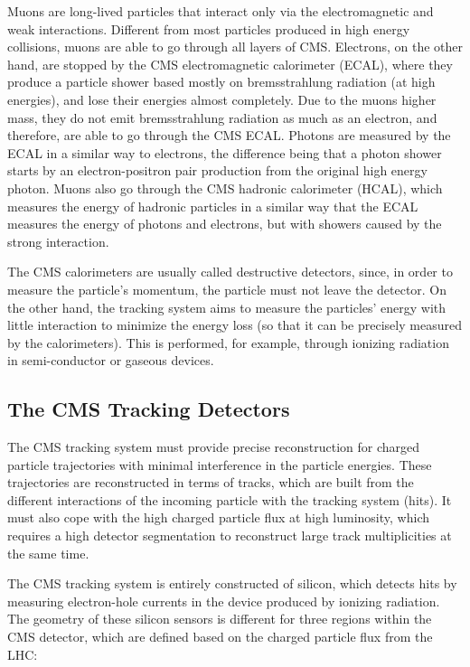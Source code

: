 Muons are long-lived particles that interact only via the electromagnetic and weak interactions. 
Different from most particles produced in high energy collisions, muons are able to go through all layers of CMS. 
Electrons, on the other hand, are stopped by the CMS electromagnetic calorimeter (ECAL), where they produce a particle shower based mostly on bremsstrahlung radiation (at high energies), and lose their energies almost completely. 
Due to the muons higher mass, they do not emit bremsstrahlung radiation as much as an electron, and therefore, are able to go through the CMS ECAL. 
Photons are measured by the ECAL in a similar way to electrons, the difference being that a photon shower starts by an electron-positron pair production from the original high energy photon. 
Muons also go through the CMS hadronic calorimeter (HCAL), which measures the energy of hadronic particles in a similar way that the ECAL measures the energy of photons and electrons, but with showers caused by the strong interaction. 

The CMS calorimeters are usually called destructive detectors, since, in order to measure the particle's momentum, the particle must not leave the detector.
On the other hand, the tracking system aims to measure the particles' energy with little interaction to minimize the energy loss (so that it can be precisely measured by the calorimeters). This is performed, for example, through ionizing radiation in semi-conductor or gaseous devices. 

\subsection{The CMS Tracking Detectors}

The CMS tracking system must provide precise reconstruction for charged particle trajectories with minimal interference in the particle energies. 
These trajectories are reconstructed in terms of tracks, which are built from the different interactions of the incoming particle with the tracking system (hits). 
It must also cope with the high charged particle flux at high luminosity, which requires a high detector segmentation to reconstruct large track multiplicities at the same time. 

The CMS tracking system is entirely constructed of silicon, which detects hits by measuring electron-hole currents in the device produced by ionizing radiation. 
The geometry of these silicon sensors is different for three regions within the CMS detector, which are defined based on the charged particle flux from the LHC:

